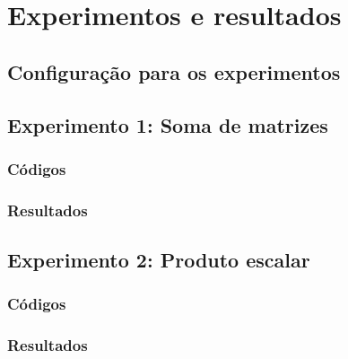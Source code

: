 \section{Experimentos e resultados}
\label{sec:experimentos}

\subsection{Configuração para os experimentos}
\label{subsec:configuracaoexp}

\subsection{Experimento 1: Soma de matrizes}
\label{subsec:soma}

\subsubsection{Códigos}
\label{subsub:codigos1}

\subsubsection{Resultados}
\label{subsub:resultados1}

\subsection{Experimento 2: Produto escalar}
\label{subsec:produto}

\subsubsection{Códigos}
\label{subsub:codigos2}

\subsubsection{Resultados}
\label{subsub:resultados2}